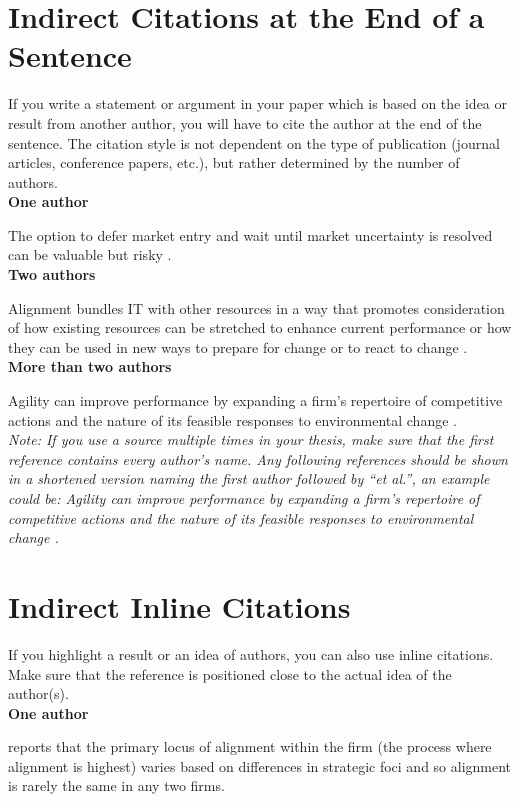 \section{Indirect Citations at the End of a Sentence}
If you write a statement or argument in your paper which is based on the idea or result from another author, you will have to cite the author at the end of the sentence. The citation style is not dependent on the type of publication (journal articles, conference papers, etc.), but rather determined by the number of authors.\\

\textbf{One author} 

The option to defer market entry and wait until market uncertainty is resolved can be valuable but risky \citep{fichman2004real}.\\

\textbf{Two authors}

Alignment bundles IT with other resources in a way that promotes consideration of how existing resources can be stretched to enhance current performance or how they can be used in new ways to prepare for change or to react to change \citep*{soh1995creates}.\\

\textbf{More than two authors}

Agility can improve performance by expanding a firm’s repertoire of competitive actions and the nature of its feasible responses to environmental change \citep*{lewis2003sources}. \\
\textit{Note: If you use a source multiple times in your thesis, make sure that the first reference contains every author’s name. Any following references should be shown in a shortened version naming the first author followed by “et al.”, an example could be: Agility can improve performance by expanding a firm’s repertoire of competitive actions and the nature of its feasible responses to environmental change \citep{lewis2003sources}.}
\section{Indirect Inline Citations}
If you highlight a result or an idea of authors, you can also use inline citations. Make sure that the reference is positioned close to the actual idea of the author(s).\\

\textbf{One author}

\cite{tallon2007process} reports that the primary locus of alignment within the firm (the process where alignment is highest) varies based on differences in strategic foci and so alignment is rarely the same in any two firms.\\

